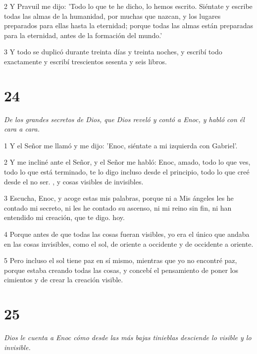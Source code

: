 \par 2 Y Pravuil me dijo: 'Todo lo que te he dicho, lo hemos escrito. Siéntate y escribe todas las almas de la humanidad, por muchas que nazcan, y los lugares preparados para ellas hasta la eternidad; porque todas las almas están preparadas para la eternidad, antes de la formación del mundo.'

\par 3 Y todo se duplicó durante treinta días y treinta noches, y escribí todo exactamente y escribí trescientos sesenta y seis libros.

\chapter{24}

\par \textit{De los grandes secretos de Dios, que Dios reveló y contó a Enoc, y habló con él cara a cara.}

\par 1 Y el Señor me llamó y me dijo: 'Enoc, siéntate a mi izquierda con Gabriel'.

\par 2 Y me incliné ante el Señor, y el Señor me habló: Enoc, amado, todo lo que ves, todo lo que está terminado, te lo digo incluso desde el principio, todo lo que creé desde el no ser. , y cosas visibles de invisibles.

\par 3 Escucha, Enoc, y acoge estas mis palabras, porque ni a Mis ángeles les he contado mi secreto, ni les he contado su ascenso, ni mi reino sin fin, ni han entendido mi creación, que te digo. hoy.

\par 4 Porque antes de que todas las cosas fueran visibles, yo era el único que andaba en las cosas invisibles, como el sol, de oriente a occidente y de occidente a oriente.

\par 5 Pero incluso el sol tiene paz en sí mismo, mientras que yo no encontré paz, porque estaba creando todas las cosas, y concebí el pensamiento de poner los cimientos y de crear la creación visible.

\chapter{25}

\par \textit{Dios le cuenta a Enoc cómo desde las más bajas tinieblas desciende lo visible y lo invisible.}

